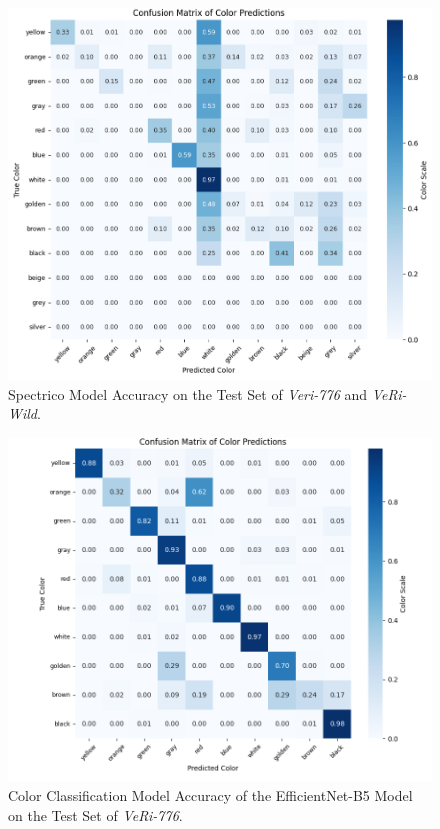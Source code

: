 \begin{center}
    \begin{figure}[H]
        \includegraphics[width=1.00\textwidth]{Images/ConfusionMatrixSpectrico.png}
        \caption[Color Classification Model Accuracy - Spectrico]{Spectrico Model Accuracy on the Test Set of \textit{Veri-776} and \textit{VeRi-Wild}.}
        \label{fig:ConfusionMatrixSpectrico}
    \end{figure}
\end{center}

\begin{center}
    \begin{figure}[H]
        \includegraphics[width=1.00\textwidth]{Images/ConfusionMatrixEfficientNet.png}
        \caption[Color Classification Model Accuracy - EfficientNet]{Color Classification Model Accuracy of the EfficientNet-B5 Model on the Test Set of \textit{VeRi-776}.}
        \label{fig:ConfusionMatrixEfficientNet}
    \end{figure}
\end{center}

